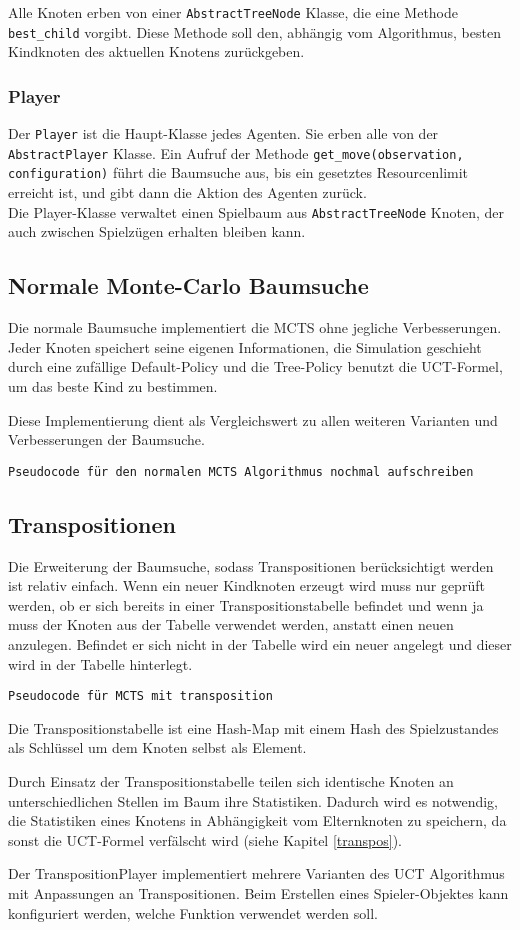 Alle Knoten erben von einer \texttt{AbstractTreeNode} Klasse, die eine Methode \texttt{best\_child} vorgibt. Diese Methode soll den, abhängig vom Algorithmus, besten Kindknoten des aktuellen Knotens zurückgeben.

\subsubsection{Player}
Der \texttt{Player} ist die Haupt-Klasse jedes Agenten. Sie erben alle von der \texttt{AbstractPlayer} Klasse. Ein Aufruf der Methode \texttt{get\_move(observation, configuration)} führt die Baumsuche aus, bis ein gesetztes Resourcenlimit erreicht ist, und gibt dann die Aktion des Agenten zurück.\\
Die Player-Klasse verwaltet einen Spielbaum aus \texttt{AbstractTreeNode} Knoten, der auch zwischen Spielzügen erhalten bleiben kann.


\subsection{Normale Monte-Carlo Baumsuche}

Die normale Baumsuche implementiert die MCTS ohne jegliche Verbesserungen. Jeder Knoten speichert seine eigenen Informationen, die Simulation geschieht durch eine zufällige Default-Policy und die Tree-Policy benutzt die UCT-Formel, um das beste Kind zu bestimmen.

Diese Implementierung dient als Vergleichswert zu allen weiteren Varianten und Verbesserungen der Baumsuche.

\texttt{Pseudocode für den normalen MCTS Algorithmus nochmal aufschreiben}

\subsection{Transpositionen}

Die Erweiterung der Baumsuche, sodass Transpositionen berücksichtigt werden ist relativ einfach. Wenn ein neuer Kindknoten erzeugt wird muss nur geprüft werden, ob er sich bereits in einer Transpositionstabelle befindet und wenn ja muss der Knoten aus der Tabelle verwendet werden, anstatt einen neuen anzulegen. Befindet er sich nicht in der Tabelle wird ein neuer angelegt und dieser wird in der Tabelle hinterlegt.

\texttt{Pseudocode für MCTS mit transposition}

Die Transpositionstabelle ist eine Hash-Map mit einem Hash des Spielzustandes als Schlüssel um dem Knoten selbst als Element.

Durch Einsatz der Transpositionstabelle teilen sich identische Knoten an unterschiedlichen Stellen im Baum ihre Statistiken. Dadurch wird es notwendig, die Statistiken eines Knotens in Abhängigkeit vom Elternknoten zu speichern, da sonst die UCT-Formel verfälscht wird (siehe Kapitel \ref{transpos}).

Der TranspositionPlayer implementiert mehrere Varianten des UCT Algorithmus mit Anpassungen an Transpositionen. Beim Erstellen eines Spieler-Objektes kann konfiguriert werden, welche Funktion verwendet werden soll.
